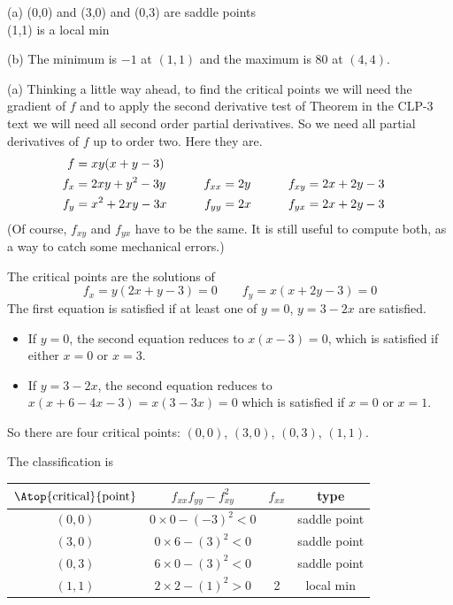 \begin{answer}
(a) 
(0,0) and (3,0) and (0,3)  are saddle points\\
\phantom{(a) }(1,1) is a local min

(b)
The minimum is $-1$ at $(1,1)$ and the maximum is $80$ at $(4,4)$.
\end{answer}

\begin{solution}
(a)
Thinking a little way ahead, to find the critical points we will need the
gradient of $f$ and to apply the second derivative test of 
Theorem  in the CLP-3 text 
we will need all 
second order partial derivatives. So we need all partial derivatives of
$f$ up to order two.
Here they are.
\begin{alignat*}{3}
f&=xy(x + y - 3) \hidewidth\\
f_x&=2xy+y^2-3y   & f_{xx}&=2y \qquad & f_{xy}&= 2x+2y-3\\
f_y&=x^2+2xy-3x \qquad & f_{yy}&=2x\qquad & f_{yx}&= 2x+2y-3
\end{alignat*}
(Of course, $f_{xy}$ and $f_{yx}$ have to be the same. It is still
useful to compute both, as a way to catch some mechanical errors.)

The critical points are the solutions of
\begin{equation*}
f_x=y(2x+y-3)=0   \qquad
f_y=x(x+2y-3) = 0
\end{equation*}
The first equation is satisfied if at least one of $y=0$, $y=3-2x$
are satisfied.
\begin{itemize}
\item 
If $y=0$, the second equation reduces to $x(x-3)=0$, which is
satisfied if either $x=0$ or $x=3$.
\item 
If $y=3-2x$, the second equation reduces to $x(x+6-4x-3)=x(3-3x)=0$
which is satisfied if $x=0$ or $x=1$.
\end{itemize}
So there are four critical points: $(0,0)$, $(3,0)$, $(0,3)$,
$(1,1)$.


The classification is
\begin{center}
\renewcommand{\arraystretch}{1.3}
     \begin{tabular}{|c|c|c|c|}
     \hline
    $\Atop{\text{critical}}{\text{point}}$  & $f_{xx}f_{yy}-f_{xy}^2$ & 
                                                          $f_{xx}$ & type \\    
    \hline
     $(0,0)$  & $0\times 0-(-3)^2< 0$ &    & saddle point  \\ \hline
     $(3,0)$  & $0\times 6-(3)^2<0$ &   & saddle point \\  \hline
     $(0,3)$  & $6\times 0-(3)^2<0$ &   & saddle point \\  \hline
     $(1,1)$  & $2\times 2-(1)^2>0$ & 2 & local min \\  \hline
     \end{tabular}
\renewcommand{\arraystretch}{1.0}
\end{center}


\end{solution}
